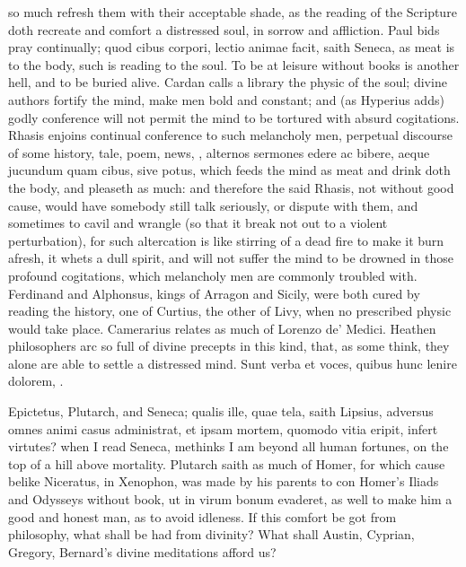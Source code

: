 {so much refresh them with their acceptable shade, as the reading of the
Scripture doth recreate and comfort a distressed soul, in sorrow and
affliction. Paul bids pray continually; quod cibus corpori, lectio
animae facit, saith Seneca, as meat is to the body, such is reading to
the soul. To be at leisure without books is another hell, and to
be buried alive. Cardan calls a library the physic of the soul;
divine authors fortify the mind, make men bold and constant; and
(as Hyperius adds) godly conference will not permit the mind to be
tortured with absurd cogitations. Rhasis enjoins continual conference
to such melancholy men, perpetual discourse of some history, tale,
poem, news, \etc{}, alternos sermones edere ac bibere, aeque jucundum quam
cibus, sive potus, which feeds the mind as meat and drink doth the
body, and pleaseth as much: and therefore the said Rhasis, not without
good cause, would have somebody still talk seriously, or dispute with
them, and sometimes to cavil and wrangle (so that it break not
out to a violent perturbation), for such altercation is like stirring
of a dead fire to make it burn afresh, it whets a dull spirit, and will
not suffer the mind to be drowned in those profound cogitations, which
melancholy men are commonly troubled with. Ferdinand and
Alphonsus, kings of Arragon and Sicily, were both cured by reading the
history, one of Curtius, the other of Livy, when no prescribed physic
would take place. Camerarius relates as much of Lorenzo de'
Medici. Heathen philosophers arc so full of divine precepts in this
kind, that, as some think, they alone are able to settle a distressed
mind. Sunt verba et voces, quibus hunc lenire dolorem, \etc{}.

Epictetus, Plutarch, and Seneca; qualis ille, quae tela, saith Lipsius,
adversus omnes animi casus administrat, et ipsam mortem, quomodo vitia
eripit, infert virtutes? when I read Seneca, methinks I am beyond
all human fortunes, on the top of a hill above mortality. Plutarch
saith as much of Homer, for which cause belike Niceratus, in Xenophon,
was made by his parents to con Homer's Iliads and Odysseys without
book, ut in virum bonum evaderet, as well to make him a good and honest
man, as to avoid idleness. If this comfort be got from philosophy, what
shall be had from divinity? What shall Austin, Cyprian, Gregory,
Bernard's divine meditations afford us?

}
